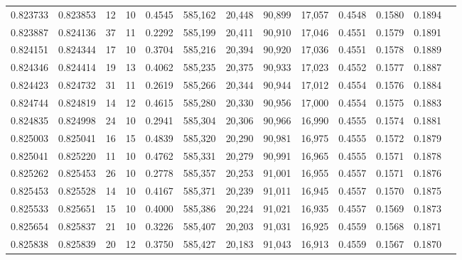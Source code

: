 \begin{tabular}{rrrrrrrrrrrrr}
0.823733 & 0.823853 &    12 &  10 &                                     0.4545 & 585,162 &  20,448 &  90,899 &  17,057 & 0.4548 & 0.1580 & 0.1894 \\
0.823887 & 0.824136 &    37 &  11 &                                     0.2292 & 585,199 &  20,411 &  90,910 &  17,046 & 0.4551 & 0.1579 & 0.1891 \\
0.824151 & 0.824344 &    17 &  10 &                                     0.3704 & 585,216 &  20,394 &  90,920 &  17,036 & 0.4551 & 0.1578 & 0.1889 \\
0.824346 & 0.824414 &    19 &  13 &                                     0.4062 & 585,235 &  20,375 &  90,933 &  17,023 & 0.4552 & 0.1577 & 0.1887 \\
0.824423 & 0.824732 &    31 &  11 &                                     0.2619 & 585,266 &  20,344 &  90,944 &  17,012 & 0.4554 & 0.1576 & 0.1884 \\
0.824744 & 0.824819 &    14 &  12 &                                     0.4615 & 585,280 &  20,330 &  90,956 &  17,000 & 0.4554 & 0.1575 & 0.1883 \\
0.824835 & 0.824998 &    24 &  10 &                                     0.2941 & 585,304 &  20,306 &  90,966 &  16,990 & 0.4555 & 0.1574 & 0.1881 \\
0.825003 & 0.825041 &    16 &  15 &                                     0.4839 & 585,320 &  20,290 &  90,981 &  16,975 & 0.4555 & 0.1572 & 0.1879 \\
0.825041 & 0.825220 &    11 &  10 &                                     0.4762 & 585,331 &  20,279 &  90,991 &  16,965 & 0.4555 & 0.1571 & 0.1878 \\
0.825262 & 0.825453 &    26 &  10 &                                     0.2778 & 585,357 &  20,253 &  91,001 &  16,955 & 0.4557 & 0.1571 & 0.1876 \\
0.825453 & 0.825528 &    14 &  10 &                                     0.4167 & 585,371 &  20,239 &  91,011 &  16,945 & 0.4557 & 0.1570 & 0.1875 \\
0.825533 & 0.825651 &    15 &  10 &                                     0.4000 & 585,386 &  20,224 &  91,021 &  16,935 & 0.4557 & 0.1569 & 0.1873 \\
0.825654 & 0.825837 &    21 &  10 &                                     0.3226 & 585,407 &  20,203 &  91,031 &  16,925 & 0.4559 & 0.1568 & 0.1871 \\
0.825838 & 0.825839 &    20 &  12 &                                     0.3750 & 585,427 &  20,183 &  91,043 &  16,913 & 0.4559 & 0.1567 & 0.1870 \\

\end{tabular}
